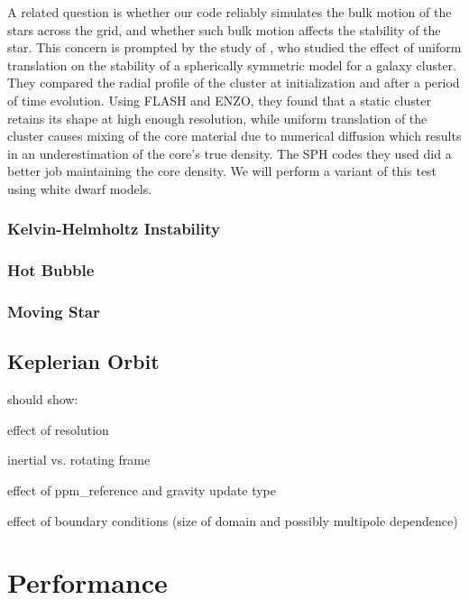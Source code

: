 \documentclass[12pt,preprint]{aastex}
\begin{document}
A related question is whether our code reliably simulates the bulk motion of the stars across the grid, and whether such bulk motion affects the stability of the star. This concern is prompted by the study of \cite{tasker:2008}, who studied the effect of uniform translation on the stability of a spherically symmetric model for a galaxy cluster. They compared the radial profile of the cluster at initialization and after a period of time evolution. Using FLASH and ENZO, they found that a static cluster retains its shape at high enough resolution, while uniform translation of the cluster causes mixing of the core material due to numerical diffusion which results in an underestimation of the core's true density. The SPH codes they used did a better job maintaining the core density. We will perform a variant of this test using white dwarf models.

\subsubsection{Kelvin-Helmholtz Instability}\label{sec:khi}

\subsubsection{Hot Bubble}\label{sec:hot_bubble}

\subsubsection{Moving Star}\label{sed:moving_star}

\subsection{Keplerian Orbit}\label{sec:kepler}

should show:

effect of resolution

inertial vs. rotating frame

effect of ppm\_reference and gravity update type

effect of boundary conditions (size of domain and possibly multipole dependence)


\section{Performance}\label{sec:Performance}
\end{document}
